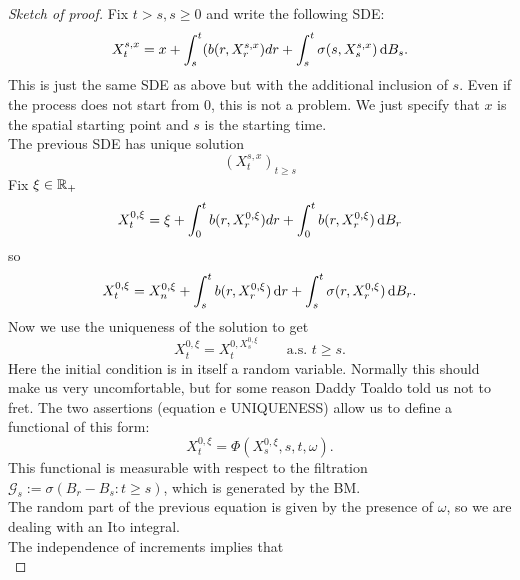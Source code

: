 \begin{ProofBox}
    \begin{proof}[Sketch of proof]
        Fix $t > s, s \geq 0$ and write the following SDE:
        \begin{equation*}
            X_t^{s,x} = x + \int_s^t (b(r,X_r^{s,x}) dr + \int_s^t \sigma(s,X_s^{s,x}) \mathop{}\!\mathrm{d} B_s.
        \end{equation*}
        This is just the same SDE as above but with the additional inclusion of $s$.
        Even if the process does not start from $0$, this is not a problem. We just specify that $x$ is the spatial starting point and $s$ is the starting time. \\
        The previous SDE has unique solution
        \begin{equation*}
            (X_t^{s,x})_{t \geq s}
        \end{equation*}
        Fix $\xi \in \mathbb{R}_+$
        \begin{equation*}
            X_t^{0,\xi} = \xi + \int_0^t b(r,X_r^{0,\xi}) dr + \int_0^t b(r,X_r^{0,\xi})\mathop{}\!\mathrm{d} B_r
        \end{equation*}
        so
        \begin{equation*}
            X_t^{0,\xi}=X_n^{0,\xi}+\int_s^tb(r,X^{0,\xi}_r)\mathop{}\!\mathrm{d} r+\int_{s}^{t}\sigma(r,X_r^{0,\xi})\mathop{}\!\mathrm{d} B_r.
        \end{equation*}
        Now we use the uniqueness of the solution to get
        \begin{equation*}
        	X_t^{0,\xi}=X_t^{0,X_s^{0,\xi}}\qquad \text{a.s. }t\geq s.
        \end{equation*}
        Here the initial condition is in itself a random variable. Normally this should make us very uncomfortable, but for some reason Daddy Toaldo told us not to fret.
        The two assertions (equation e UNIQUENESS) allow us to define a functional of this form:
        \begin{equation*}
            X_t^{0,\xi} = \Phi(X_s^{0,\xi}, s, t, \omega).
        \end{equation*}
        This functional is measurable with respect to the filtration $\mathcal{G}_s := \sigma(B_r-B_s: t \geq s)$, which is generated by the BM. \\
        The random part of the previous equation is given by the presence of $\omega$, so we are dealing with an Ito integral. \\
        The independence of increments implies that
        \begin{equation*}

\end{equation*}
\end{proof}
\end{ProofBox}
